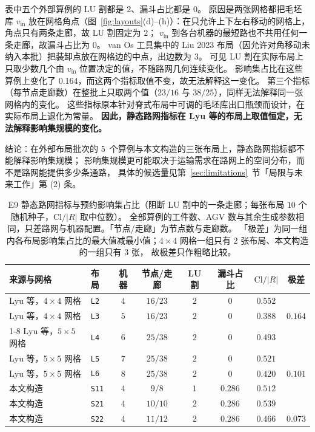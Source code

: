 \documentclass[manuscript,screen,review]{acmart}
\newcommand{\NSeeds}{10}
\newcommand{\NPubInst}{5}
\newcommand{\PubCloSpread}{0.164}
\newcommand{\PubCloSpreadBig}{0.101}
\newcommand{\SelfCloSpread}{0.073}
\begin{document}
表中五个外部算例的 LU 割都是 \(2\)、漏斗占比都是 \(0\)。
原因是两张网格都把毛坯库 \(v_{\mathrm{in}}\) 放在网格角点（图~\ref{fig:layouts}(d)--(h)）：在只允许上下左右移动的网格上，角点只有两条走廊，故 LU 割固定为 \(2\)；
\(v_{\mathrm{in}}\) 到各台机器的最短路也不共用任何一条走廊，故漏斗占比为 \(0\)。
van Os 工具集中的 Liu 2023 布局（因允许对角移动未纳入本批）把装卸点放在网格边的中点，出边数为 \(3\)。
可见 LU 割在实际布局上只取少数几个由 \(v_{\mathrm{in}}\) 位置决定的值，不随路网几何连续变化。
影响集占比在这些算例上变化了 \PubCloSpread，而这两个指标取值不变，故无法解释这一变化。
第三个指标（每节点走廊数）在整批上只取两个值（\(23/16\) 与 \(38/25\)），同样无法解释同一张网格内的变化。
这些指标原本针对脊式布局中可调的毛坯库出口瓶颈而设计，在实际布局上退化为常量。
\textbf{因此，静态路网指标在 Lyu 等的布局上取值恒定，无法解释影响集规模的变化。}

结论：在外部布局批次的 \NPubInst\ 个算例与本文构造的三张布局上，静态路网指标都不能解释影响集规模；
影响集规模更可能取决于运输需求在路网上的空间分布，而不是路网能提供多少条通路，
具体的候选量见第~\ref{sec:limitations}~节「局限与未来工作」第 (2) 条。

\begin{table}[t]
\centering
\caption{E9 静态路网指标与预约影响集占比（阻断 LU 割中的一条走廊；每张布局 \(\NSeeds\) 个随机种子，\(\mathrm{Cl}/|R|\) 取中位数）。
全部算例的工件数、AGV 数与其余生成参数相同，只差路网与机器配置。「节点/走廊」为节点数与走廊数。
「极差」为同一组内各布局影响集占比的最大值减最小值；\(4\times 4\) 网格一组只有 \(2\) 张布局、本文构造的一组只有 \(3\) 张，
故极差只作粗略比较。}
\label{tab:e4pub}
\small
\begin{tabular}{@{}llcccccc@{}}
\toprule
来源与网格 & 布局 & 机器 & 节点/走廊 & LU 割 & 漏斗占比 & \(\mathrm{Cl}/|R|\)
 & 极差 \\
\midrule
Lyu 等，\(4\times 4\) 网格 & \texttt{L2} & \(4\) & \(16/23\) & \(2\) & \(0\) & \(0.552\) & \\
Lyu 等，\(4\times 4\) 网格 & \texttt{L3} & \(5\) & \(16/23\) & \(2\) & \(0\) & \(0.388\)
  & \(\PubCloSpread\) \\
\cmidrule{1-8}
Lyu 等，\(5\times 5\) 网格 & \texttt{L4} & \(6\) & \(25/38\) & \(2\) & \(0\) & \(0.493\) & \\
Lyu 等，\(5\times 5\) 网格 & \texttt{L5} & \(7\) & \(25/38\) & \(2\) & \(0\) & \(0.521\) & \\
Lyu 等，\(5\times 5\) 网格 & \texttt{L6} & \(8\) & \(25/38\) & \(2\) & \(0\) & \(0.420\)
  & \(\PubCloSpreadBig\) \\
\midrule
本文构造 & \texttt{S11} & \(4\) & \(9/8\) & \(1\) & \(0.286\) & \(0.512\) & \\
本文构造 & \texttt{S21} & \(4\) & \(10/10\) & \(2\) & \(0.286\) & \(0.539\) & \\
本文构造 & \texttt{S22} & \(4\) & \(11/12\) & \(2\) & \(0.286\) & \(0.466\)
  & \(\SelfCloSpread\) \\
\bottomrule
\end{tabular}
\end{table}
\end{document}
